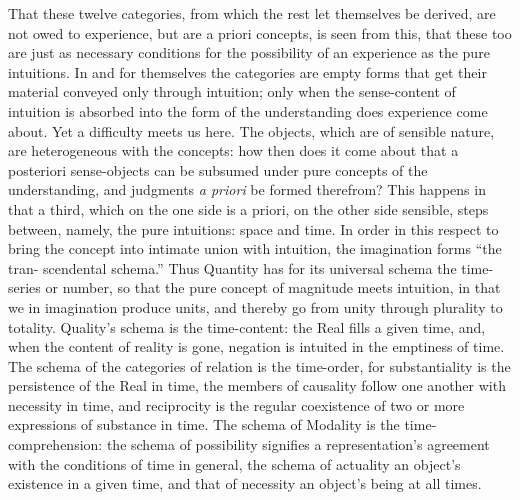\documentclass[12pt]{book}
\begin{document}
That these twelve categories, from which the rest let themselves be derived, are
not owed to experience, but are a priori concepts, is seen from this, that these
too are just as necessary conditions for the possibility of an experience as the
pure intuitions. In and for themselves the categories are empty forms that get
their material conveyed only through intuition; only when the sense-content of
intuition is absorbed into the form of the understanding does experience come
about. Yet a difficulty meets us here. The objects, which are of sensible nature,
are heterogeneous with the concepts: how then does it come about that a posteriori
sense-objects can be subsumed under pure concepts of the understanding, and
judgments \textit{a priori} be formed therefrom? This happens in that a third,
which on the one side is a priori, on the other side sensible, steps between,
namely, the pure intuitions: space and time. In order in this respect to bring the
concept into intimate union with intuition, the imagination forms ``the tran-
scendental schema.'' Thus Quantity has for its universal schema the time-series or
number, so that the pure concept of magnitude meets intuition, in that we in
imagination produce units, and thereby go from unity through plurality to
totality. Quality's schema is the time-content: the Real fills a given time, and,
when the content of reality is gone, negation is intuited in the emptiness of
time. The schema of the categories of relation is the time-order, for
substantiality is the persistence of the Real in time, the members of causality
follow one another with necessity in time, and reciprocity is the regular
coexistence of two or more expressions of substance in time. The schema of
Modality is the time-comprehension: the schema of possibility signifies a
representation's agreement with the conditions of time in general, the schema of
actuality an object's existence in a given time, and that of necessity an object's
being at all times.
\end{document}
